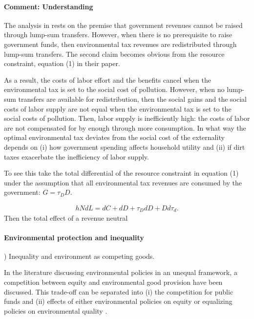 \paragraph{Comment: Understanding \cite{LansBovenberg1994EnvironmentalTaxation}}

The analysis in \cite{LansBovenberg1994EnvironmentalTaxation} rests on the premise that government revenues cannot be raised through lump-sum transfers. However, when there is no prerequisite to raise government funds, then environmental tax revenues are redistributed through lump-sum transfers. The second claim becomes obvious from the resource constraint, equation (1) in their paper. 

As a result, the costs of labor effort and the benefits cancel when the environmental tax is set to the social cost of pollution. However, when no lump-sum transfers are available for redistribution, then the social gains and the social costs of labor supply are not equal when the environmental tax is set to the social costs of pollution. Then, labor supply is inefficiently high: the costs of labor are not compensated for by enough through more consumption. In what way the optimal environmental tax deviates from the social cost of the externality depends on (i) how government spending affects household utility and (ii) if dirt taxes exacerbate the inefficiency of labor supply. 

To see this take the total differential of the resource constraint in \cite{LansBovenberg1994EnvironmentalTaxation} equation (1) under the assumption that all environmental tax revenues are consumed by the government: $G=\tau_D D$.

\begin{align}
hNdL = dC+dD+\tau_D dD +D d\tau_d.
\end{align}
 Then the total effect of a revenue neutral 


\paragraph{Environmental protection and inequality}
) Inequality and environment as competing goods.

In the literature discussing environmental policies in an unequal framework, a competition between equity and environmental good provision have been discussed. 
This trade-off can be separated into (i) the competition for public funds \citep{LansBovenberg1996OptimalAnalyses, Jacobs2019RedistributionCurves} and (ii) effects of either environmental policies on equity or equalizing policies on environmental quality \citep{Jacobs2019RedistributionCurves, Sager2019IncomeCurves, Dobkowitz2022}. 

